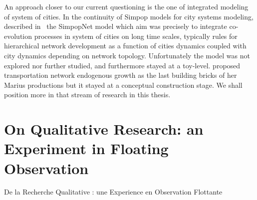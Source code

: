 
An approach closer to our current questioning is the one of integrated modeling of system of cities. In the continuity of Simpop models for city systems modeling,  described in~\cite{schmitt2014modelisation} the SimpopNet model which aim was precisely to integrate co-evolution processes in system of cities on long time scales, typically rules for hierarchical network development as a function of cities dynamics coupled with city dynamics depending on network topology. Unfortunately the model was not explored nor further studied, and furthermore stayed at a toy-level.  proposed transportation network endogenous growth as the last building bricks of her Marius productions but it stayed at a conceptual construction stage. We shall position more in that stream of research in this thesis.











\section[Observation Flottante]{On Qualitative Research: an Experiment in Floating Observation}{De la Recherche Qualitative : une Experience en Observation Flottante}


